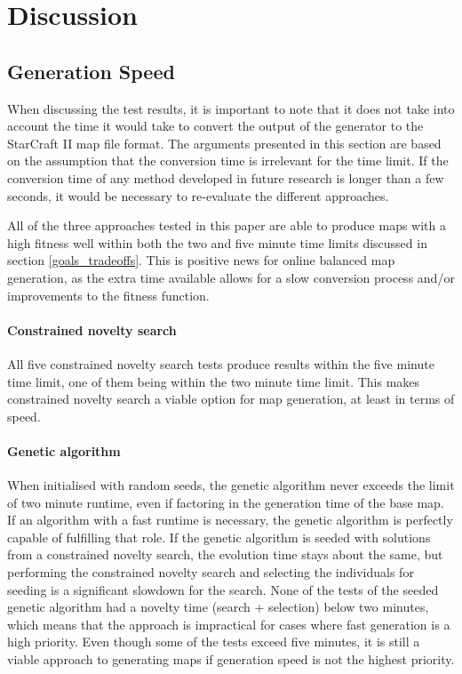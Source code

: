\chapter{Discussion}
\label{discussion_quality}

\section{Generation Speed}
\label{discussion_speed}
When discussing the test results, it is important to note that it does not take into account the time it would take to convert the output of the generator to the StarCraft II map file format. The arguments presented in this section are based on the assumption that the conversion time is irrelevant for the time limit. If the conversion time of any method developed in future research is longer than a few seconds, it would be necessary to re-evaluate the different approaches.

All of the three approaches tested in this paper are able to produce maps with a high fitness well within both the two and five minute time limits discussed in section \ref{goals_tradeoffs}. This is positive news for online balanced map generation, as the extra time available allows for a slow conversion process and/or improvements to the fitness function.

\subsubsection{Constrained novelty search}
All five constrained novelty search tests produce results within the five minute time limit, one of them being within the two minute time limit. This makes constrained novelty search a viable option for map generation, at least in terms of speed.

\subsubsection{Genetic algorithm}
When initialised with random seeds, the genetic algorithm never exceeds the limit of two minute runtime, even if factoring in the generation time of the base map. If an algorithm with a fast runtime is necessary, the genetic algorithm is perfectly capable of fulfilling that role. If the genetic algorithm is seeded with solutions from a constrained novelty search, the evolution time stays about the same, but performing the constrained novelty search and selecting the individuals for seeding is a significant slowdown for the search. None of the tests of the seeded genetic algorithm had a novelty time (search + selection) below two minutes, which means that the approach is impractical for cases where fast generation is a high priority. Even though some of the tests exceed five minutes, it is still a viable approach to generating maps if generation speed is not the highest priority.

